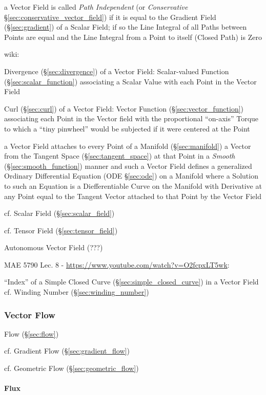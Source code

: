 a Vector Field is called \emph{Path Independent} (or \emph{Conservative}
\S\ref{sec:conservative_vector_field}) if it is equal to the Gradient Field
(\S\ref{sec:gradient}) of a Scalar Field; if so the Line Integral of all Paths
between Points are equal and the Line Integral from a Point to itself (Closed
Path) is Zero

wiki:

Divergence (\S\ref{sec:divergence}) of a Vector Field: Scalar-valued Function
(\S\ref{sec:scalar_function}) associating a Scalar Value with each Point in
the Vector Field

Curl (\S\ref{sec:curl}) of a Vector Field: Vector Function
(\S\ref{sec:vector_function}) associating each Point in the Vector field with
the proportional ``on-axis'' Torque to which a ``tiny pinwheel'' would be
subjected if it were centered at the Point

a Vector Field attaches to every Point of a Manifold (\S\ref{sec:manifold}) a
Vector from the Tangent Space (\S\ref{sec:tangent_space}) at that Point in a
\emph{Smooth} (\S\ref{sec:smooth_function}) manner and such a Vector Field
defines a generalized Ordinary Differential Equation (ODE \S\ref{sec:ode}) on a
Manifold where a Solution to such an Equation is a Diefferentiable Curve on the
Manifold with Derivative at any Point equal to the Tangent Vector attached to
that Point by the Vector Field

cf. Scalar Field (\S\ref{sec:scalar_field})

cf. Tensor Field (\S\ref{sec:tensor_field})

Autonomous Vector Field (???)


MAE 5790 Lec. 8 - \url{https://www.youtube.com/watch?v=O2fcpxLT5wk}:

``Index'' of a Simple Closed Curve (\S\ref{sec:simple_closed_curve}) in a
Vector Field \fist cf. Winding Number (\S\ref{sec:winding_number})



\subsubsection{Vector Flow}\label{sec:vector_flow}

Flow (\S\ref{sec:flow})

cf. Gradient Flow (\S\ref{sec:gradient_flow})

cf. Geometric Flow (\S\ref{sec:geometric_flow})



\paragraph{Flux}\label{sec:flux}\hfill


